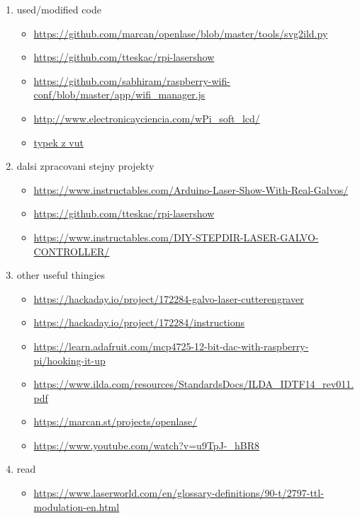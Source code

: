 \documentclass{template/socthesis}
\begin{document}
\begin{enumerate}
  \item used/modified code
  \begin{itemize}
    \item \url{https://github.com/marcan/openlase/blob/master/tools/svg2ild.py}
    \item \url{https://github.com/tteskac/rpi-lasershow}
    \item \url{https://github.com/sabhiram/raspberry-wifi-conf/blob/master/app/wifi\_manager.js}
    \item \url{http://www.electronicayciencia.com/wPi\_soft\_lcd/}
    \item \href{https://dspace.vutbr.cz/bitstream/handle/11012/38621/final-thesis.pdf?sequence=-1}{typek z vut}
  \end{itemize}
  \item dalsi zpracovani stejny projekty
  \begin{itemize}
    \item \url{https://www.instructables.com/Arduino-Laser-Show-With-Real-Galvos/}
    \item \url{https://github.com/tteskac/rpi-lasershow}
    \item \url{https://www.instructables.com/DIY-STEPDIR-LASER-GALVO-CONTROLLER/}
  \end{itemize}
  \item other useful thingies
  \begin{itemize}
    \item \url{https://hackaday.io/project/172284-galvo-laser-cutterengraver}

    \item \url{https://hackaday.io/project/172284/instructions}

    \item \url{https://learn.adafruit.com/mcp4725-12-bit-dac-with-raspberry-pi/hooking-it-up}
    \item \url{https://www.ilda.com/resources/StandardsDocs/ILDA\_IDTF14\_rev011.pdf}
    \item \url{https://marcan.st/projects/openlase/}
    \item \url{https://www.youtube.com/watch?v=u9TpJ-\_hBR8}
  \end{itemize}
  \item read
  \begin{itemize}
    \item \url{https://www.laserworld.com/en/glossary-definitions/90-t/2797-ttl-modulation-en.html}
  \end{itemize}

\end{enumerate}
\end{document}
